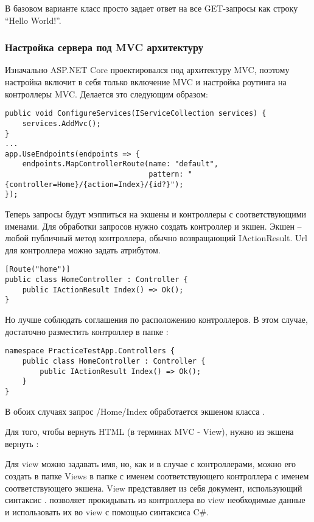 \documentclass[a4paper,14pt]{extarticle}
\begin{document}
В базовом варианте класс просто задает ответ на все GET-запросы как строку
\enquote{Hello World!}.

\subsubsection{Настройка сервера под MVC архитектуру}

Изначально ASP.NET Core проектировался под архитектуру MVC, поэтому настройка
включит в себя только включение MVC и настройка роутинга на контроллеры
MVC. Делается это следующим образом:

\begin{lstlisting}
public void ConfigureServices(IServiceCollection services) {
    services.AddMvc();
}
...
app.UseEndpoints(endpoints => {
    endpoints.MapControllerRoute(name: "default",
                                 pattern: "{controller=Home}/{action=Index}/{id?}");
});
\end{lstlisting}

Теперь запросы будут мэппиться на экшены и контроллеры с соответствующими
именами. Для обработки запросов нужно создать контроллер и экшен. Экшен -- любой
публичный метод контроллера, обычно возвращающий IActionResult. Url для
контроллера можно задать атрибутом.

\begin{lstlisting}
[Route("home")] 
public class HomeController : Controller {
    public IActionResult Index() => Ok();
}
\end{lstlisting}

Но лучше соблюдать соглашения по расположению контроллеров. В этом случае,
достаточно разместить контроллер в папке :

\begin{lstlisting}
namespace PracticeTestApp.Controllers { 
    public class HomeController : Controller {
        public IActionResult Index() => Ok();
    }
}
\end{lstlisting}

В обоих случаях запрос /Home/Index обработается экшеном  класса
.

Для того, чтобы вернуть HTML (в терминах MVC - View), нужно из экшена вернуть
:


Для view можно задавать имя, но, как и в случае с контроллерами, можно его
создать в папке Views в папке с именем соответствующего контроллера с именем
соответствующего экшена. View представляет из себя  документ,
использующий синтаксис .  позволяет прокидывать из
контроллера во view необходимые данные и использовать их во view с помощью
синтаксиса C\#.
\end{document}
